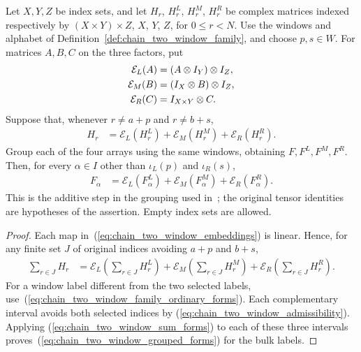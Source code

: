 \begin{lemma}
    \label{thm:chain_two_window_tensor_forms}
    \leanok
    Let $X,Y,Z$ be index sets, and let $H_r$, $H^L_r$, $H^M_r$, $H^R_r$
    be complex matrices indexed respectively by $(X\times Y)\times Z$,
    $X$, $Y$, $Z$, for $0\le r<N$.
    Use the windows and alphabet of Definition~\ref{def:chain_two_window_family},
    and choose $p,s\in W$. For matrices $A,B,C$ on the three factors, put
    \begin{align}
        \mathcal E_L(A) & =(A\otimes I_Y)\otimes I_Z,\notag \\
        \mathcal E_M(B) & =(I_X\otimes B)\otimes I_Z,\notag \\
        \mathcal E_R(C) & =I_{X\times Y}\otimes C.
        \label{eq:chain_two_window_embeddings}
    \end{align}
    Suppose that, whenever $r\ne a+p$ and $r\ne b+s$,
    \begin{align}
        H_r & =\mathcal E_L(H^L_r)+\mathcal E_M(H^M_r)+\mathcal E_R(H^R_r).
        \label{eq:chain_two_window_family_ordinary_forms}
    \end{align}
    Group each of the four arrays using the same windows, obtaining
    $F,F^L,F^M,F^R$. Then, for every $\alpha\in I$ other than
    $\iota_L(p)$ and $\iota_R(s)$,
    \begin{align}
        F_\alpha & =\mathcal E_L(F^L_\alpha)+\mathcal E_M(F^M_\alpha)
        +\mathcal E_R(F^R_\alpha).
        \label{eq:chain_two_window_grouped_forms}
    \end{align}
    This is the additive step in the grouping used in~\cite{Arad2016RigorousRG}; the original tensor identities are hypotheses
    of the assertion. Empty index sets are allowed.
\end{lemma}
\begin{proof}\leanok
    Each map in~(\ref{eq:chain_two_window_embeddings}) is linear. Hence, for
    any finite set $J$ of original indices avoiding $a+p$ and $b+s$,
    \begin{align}
        \sum_{r\in J}H_r
         & =\mathcal E_L\left(\sum_{r\in J}H^L_r\right)
        +\mathcal E_M\left(\sum_{r\in J}H^M_r\right)
        +\mathcal E_R\left(\sum_{r\in J}H^R_r\right).
        \label{eq:chain_two_window_sum_forms}
    \end{align}
    For a window label different from the two selected labels,
    use~(\ref{eq:chain_two_window_family_ordinary_forms}). Each complementary
    interval avoids both selected indices by
    (\ref{eq:chain_two_window_admissibility}). Applying
    (\ref{eq:chain_two_window_sum_forms}) to each of these three intervals
    proves~(\ref{eq:chain_two_window_grouped_forms}) for the bulk labels.
\end{proof}

